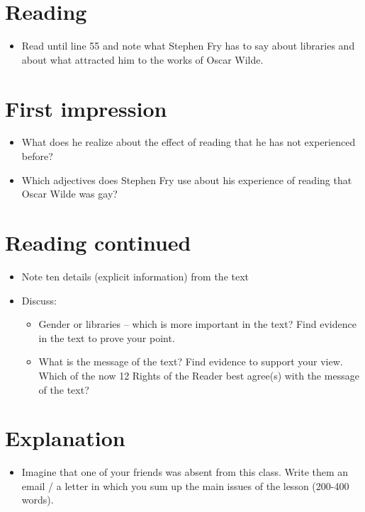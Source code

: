\documentclass[11pt,a4paper,oneside]{book}
\begin{document}
\section*{Reading}

\begin{itemize}
\item Read until line 55 and note what Stephen Fry has to say about libraries and about what attracted him to the works of Oscar Wilde.
\end{itemize}

\section*{First impression}

\begin{itemize}
\item What does he realize about the effect of reading that he has not experienced before?
\item Which adjectives does Stephen Fry use about his experience of reading that Oscar Wilde was gay?
\end{itemize}

\section*{Reading continued}

\begin{itemize}
\item Note ten details (explicit information) from the text
\item Discuss:

\begin{itemize}
\item Gender or libraries – which is more important in the text? Find evidence in the text to prove your point.
\item What is the message of the text? Find evidence to support your view. Which of the now 12 Rights of the Reader best agree(s) with the message of the text?
\end{itemize}

\end{itemize}

\section*{Explanation}

\begin{itemize}
\item Imagine that one of your friends was absent from this class. Write them an email / a letter in which you sum up the main issues of the lesson (200-400 words).
\end{itemize}
\end{document}
